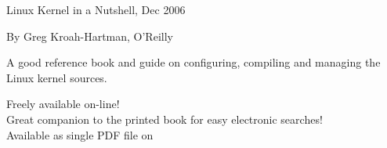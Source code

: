     Linux Kernel in a Nutshell, Dec 2006
    \startitemize
    \item By Greg Kroah-Hartman, O'Reilly\\
    \item A good reference book and guide on configuring, compiling
      and managing the Linux kernel sources.
    \item Freely available on-line!\\
      Great companion to the printed book for easy electronic searches!\\
      Available as single PDF file on
    \stopitemize


